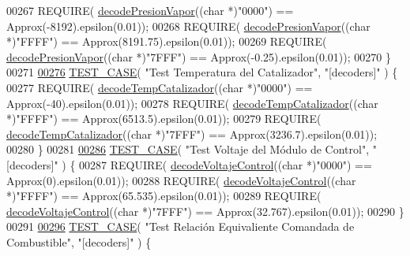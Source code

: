 \begin{DoxyCode}
{{{00267     REQUIRE( \hyperlink{decoders_8cpp_ab86bda1fcefda784e048796e2d892475}{decodePresionVapor}((\textcolor{keywordtype}{char} *)\textcolor{stringliteral}{"0000"}) == Approx(-8192).epsilon(0.01));
00268     REQUIRE( \hyperlink{decoders_8cpp_ab86bda1fcefda784e048796e2d892475}{decodePresionVapor}((\textcolor{keywordtype}{char} *)\textcolor{stringliteral}{"FFFF"}) == Approx(8191.75).epsilon(0.01));
00269     REQUIRE( \hyperlink{decoders_8cpp_ab86bda1fcefda784e048796e2d892475}{decodePresionVapor}((\textcolor{keywordtype}{char} *)\textcolor{stringliteral}{"7FFF"}) == Approx(-0.25).epsilon(0.01));
00270 \}
00271 
\hyperlink{UnitTestCase_8cpp_a4203cd502f06e1bb0b83e603e04c10cf}{00276} \hyperlink{UnitTestCase_8cpp_ab1b7b485076e7de68cd9912827a8ee86}{TEST\_CASE}( \textcolor{stringliteral}{"Test Temperatura del Catalizador"}, \textcolor{stringliteral}{"[decoders]"} ) \{
00277     REQUIRE( \hyperlink{decoders_8cpp_a8251853ca2e5b8b2e88c75f50d53bc8d}{decodeTempCatalizador}((\textcolor{keywordtype}{char} *)\textcolor{stringliteral}{"0000"}) == Approx(-40).epsilon(0.01));
00278     REQUIRE( \hyperlink{decoders_8cpp_a8251853ca2e5b8b2e88c75f50d53bc8d}{decodeTempCatalizador}((\textcolor{keywordtype}{char} *)\textcolor{stringliteral}{"FFFF"}) == Approx(6513.5).epsilon(0.01));
00279     REQUIRE( \hyperlink{decoders_8cpp_a8251853ca2e5b8b2e88c75f50d53bc8d}{decodeTempCatalizador}((\textcolor{keywordtype}{char} *)\textcolor{stringliteral}{"7FFF"}) == Approx(3236.7).epsilon(0.01));
00280 \}
00281 
\hyperlink{UnitTestCase_8cpp_a358bfaf15b84777b24d4304fb9c2f88b}{00286} \hyperlink{UnitTestCase_8cpp_ab1b7b485076e7de68cd9912827a8ee86}{TEST\_CASE}( \textcolor{stringliteral}{"Test Voltaje del Módulo de Control"}, \textcolor{stringliteral}{"[decoders]"} ) \{
00287     REQUIRE( \hyperlink{decoders_8cpp_a5937fc059394faad8c9c96a0b27a8796}{decodeVoltajeControl}((\textcolor{keywordtype}{char} *)\textcolor{stringliteral}{"0000"}) == Approx(0).epsilon(0.01));
00288     REQUIRE( \hyperlink{decoders_8cpp_a5937fc059394faad8c9c96a0b27a8796}{decodeVoltajeControl}((\textcolor{keywordtype}{char} *)\textcolor{stringliteral}{"FFFF"}) == Approx(65.535).epsilon(0.01));
00289     REQUIRE( \hyperlink{decoders_8cpp_a5937fc059394faad8c9c96a0b27a8796}{decodeVoltajeControl}((\textcolor{keywordtype}{char} *)\textcolor{stringliteral}{"7FFF"}) == Approx(32.767).epsilon(0.01));
00290 \}
00291 
\hyperlink{UnitTestCase_8cpp_a6c2278eca15c6834d6c78885a09497c4}{00296} \hyperlink{UnitTestCase_8cpp_ab1b7b485076e7de68cd9912827a8ee86}{TEST\_CASE}( \textcolor{stringliteral}{"Test Relación Equivaliente Comandada de Combustible"}, \textcolor{stringliteral}{"[decoders]"} ) \{
}}}
\end{DoxyCode}
